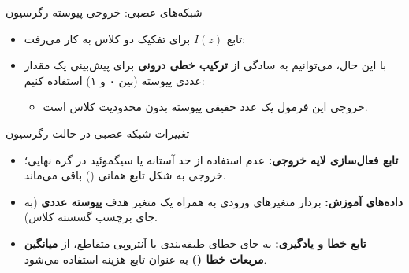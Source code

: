 \begin{frame}{شبکه‌های عصبی: خروجی پیوسته رگرسیون}{}
  \begin{itemize}\setlength{\itemsep}{3pt}\small
    \item تابع $I(z)$ برای تفکیک دو کلاس به کار می‌رفت:
    \par\vspace{1pt}\noindent{}\par\vspace{1pt}
    \par\noindent{}\par\vspace{4pt}
    \item با این حال، می‌توانیم به سادگی از \textbf{ترکیب خطی درونی} برای پیش‌بینی یک مقدار عددی پیوسته (بین ۰ و ۱) استفاده کنیم:
    \par\vspace{2pt}\noindent{}\par\vspace{2pt}
    \begin{itemize}\footnotesize
      \item خروجی این فرمول یک عدد حقیقی پیوسته بدون محدودیت کلاس است.
    \end{itemize}
  \end{itemize}
\end{frame}

\begin{frame}{تغییرات شبکه عصبی در حالت رگرسیون}{}
  \begin{itemize}
    \setlength{\itemsep}{6pt}
    \item \textbf{تابع فعال‌سازی لایه خروجی:}
    عدم استفاده از حد آستانه یا سیگموئید در گره نهایی؛ خروجی به شکل تابع همانی () باقی می‌ماند.
    \item \textbf{داده‌های آموزش:}
    بردار متغیرهای ورودی به همراه یک متغیر هدف \textbf{پیوسته عددی} (به جای برچسب گسسته کلاس).
    \item \textbf{تابع خطا و یادگیری:}
    به جای خطای طبقه‌بندی یا آنتروپی متقاطع، از \textbf{میانگین مربعات خطا ()} به عنوان تابع هزینه استفاده می‌شود.
  \end{itemize}
\end{frame}

